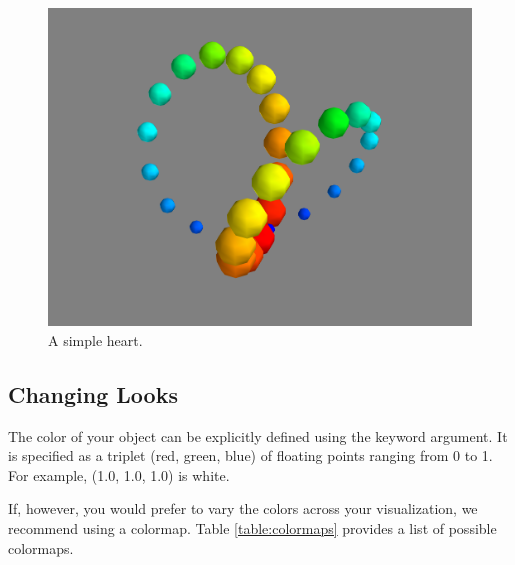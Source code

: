 \begin{figure}
\includegraphics[width=\textwidth]{points3d.png}
\caption{A simple heart.}
\label{fig:points3d}
\end{figure}

\subsection*{Changing Looks}
The color of your object can be explicitly defined using the  keyword argument.
It is specified as a triplet (red, green, blue) of floating points ranging from 0 to 1.
For example, (1.0, 1.0, 1.0) is white.

If, however, you would prefer to vary the colors across your visualization, we recommend using a colormap.
Table \ref{table:colormaps} provides a list of possible colormaps.

